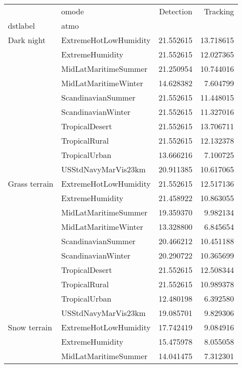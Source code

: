 \begin{tabular}{llrr}
\toprule
             & omode &  Detection &   Tracking \\
dstlabel & atmo &            &            \\
\midrule
Dark night & ExtremeHotLowHumidity &  21.552615 &  13.718615 \\
             & ExtremeHumidity &  21.552615 &  12.027365 \\
             & MidLatMaritimeSummer &  21.250954 &  10.744016 \\
             & MidLatMaritimeWinter &  14.628382 &   7.604799 \\
             & ScandinavianSummer &  21.552615 &  11.448015 \\
             & ScandinavianWinter &  21.552615 &  11.327016 \\
             & TropicalDesert &  21.552615 &  13.706711 \\
             & TropicalRural &  21.552615 &  12.132378 \\
             & TropicalUrban &  13.666216 &   7.100725 \\
             & USStdNavyMarVis23km &  20.911385 &  10.617065 \\
Grass terrain & ExtremeHotLowHumidity &  21.552615 &  12.517136 \\
             & ExtremeHumidity &  21.458922 &  10.863055 \\
             & MidLatMaritimeSummer &  19.359370 &   9.982134 \\
             & MidLatMaritimeWinter &  13.328800 &   6.845654 \\
             & ScandinavianSummer &  20.466212 &  10.451188 \\
             & ScandinavianWinter &  20.290722 &  10.365699 \\
             & TropicalDesert &  21.552615 &  12.508344 \\
             & TropicalRural &  21.552615 &  10.989378 \\
             & TropicalUrban &  12.480198 &   6.392580 \\
             & USStdNavyMarVis23km &  19.085701 &   9.829306 \\
Snow terrain & ExtremeHotLowHumidity &  17.742419 &   9.084916 \\
             & ExtremeHumidity &  15.475978 &   8.055058 \\
             & MidLatMaritimeSummer &  14.041475 &   7.312301 \\

\end{tabular}

